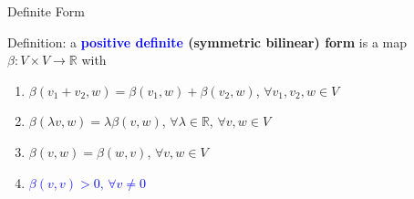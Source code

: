 \documentclass{beamer}
\newcommand{\R}{\mathbb{R}}
\begin{document}








\begin{frame}{Definite Form}

Definition: a \textbf {\textcolor{blue}{positive definite} (symmetric bilinear) form} is a map $\beta : V\times V \to \R $ with
\begin{enumerate}
    \item $\beta (v_1 + v_2 , w) = \beta (v_1 , w) +\beta ( v_2,w)$, $\forall v_1,v_2,w\in V$
    \item $\beta(\lambda v, w) = \lambda \beta (v, w)$, $\forall \lambda \in \R$, $\forall v,w \in V$
    \item $\beta( v, w) =\beta(w,v)$, $\forall v,w \in V$
    \item \textcolor{blue}{$\beta (v,v) >0, \, \forall v \neq 0$}
\end{enumerate}
\end{frame}
\end{document}
